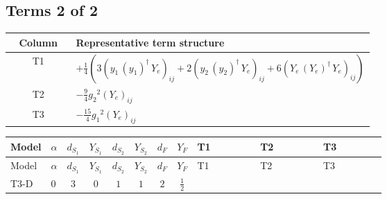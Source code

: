 \documentclass[8pt]{article}
\begin{document}
\begin{landscape}
\subsection*{Terms 2 of 2}
\begin{center}
\begin{tabular}{@{}c >{\raggedright\arraybackslash}p{0.82\linewidth}@{}}
\toprule
Column & Representative term structure \\
\midrule
T1 & \(\displaystyle +\frac{1}{4} (3 \left({y_1}\,\left({y_1}\right)^{\dagger}\,{Y_e}\right)_{ij}+2 \left({y_2}\,\left({y_2}\right)^{\dagger}\,{Y_e}\right)_{ij}+6 \left({Y_e}\,\left({Y_e}\right)^{\dagger}\,{Y_e}\right)_{ij})\) \\
\midrule
T2 & \(\displaystyle -\frac{9}{4} {g_2}^2 \left({Y_e}\right)_{ij}\) \\
\midrule
T3 & \(\displaystyle -\frac{15}{4} {g_1}^2 \left({Y_e}\right)_{ij}\) \\
\midrule
\bottomrule
\end{tabular}
\end{center}
\smallskip
\tiny
\begin{longtable}{@{}llcccccc >{\raggedright\arraybackslash}p{0.21\linewidth} >{\raggedright\arraybackslash}p{0.21\linewidth} >{\raggedright\arraybackslash}p{0.21\linewidth}@{}}
\toprule
Model & $\alpha$ & $d_{S_1}$ & $Y_{S_1}$ & $d_{S_2}$ & $Y_{S_2}$ & $d_F$ & $Y_F$ & T1 & T2 & T3 \\
\midrule
\endfirsthead
\toprule
Model & $\alpha$ & $d_{S_1}$ & $Y_{S_1}$ & $d_{S_2}$ & $Y_{S_2}$ & $d_F$ & $Y_F$ & T1 & T2 & T3 \\
\midrule
\endhead
T3-D & $0$ & $3$ & $0$ & $1$ & $1$ & $2$ & $\frac{1}{2}$ & \scriptsize\adjustbox{max width=\linewidth}{$\begin{gathered} +\frac{1}{4} (3 \left({y_1}\,\left({y_1}\right)^{\dagger}\,{Y_e}\right)_{ij}+2 \left({y_2}\,\left({y_2}\right)^{\dagger}\,{Y_e}\right)_{ij}+6 \left({Y_e}\,\left({Y_e}\right)^{\dagger}\,{Y_e}\right)_{ij})\end{gathered}$} & \scriptsize\adjustbox{max width=\linewidth}{$\begin{gathered} -\frac{9}{4} {g_2}^2 \left({Y_e}\right)_{ij}\end{gathered}$} & \scriptsize\adjustbox{max width=\linewidth}{$\begin{gathered} -\frac{15}{4} {g_1}^2 \left({Y_e}\right)_{ij}\end{gathered}$} \\
\midrule
\bottomrule
\end{longtable}
\clearpage

\end{landscape}
\end{document}
